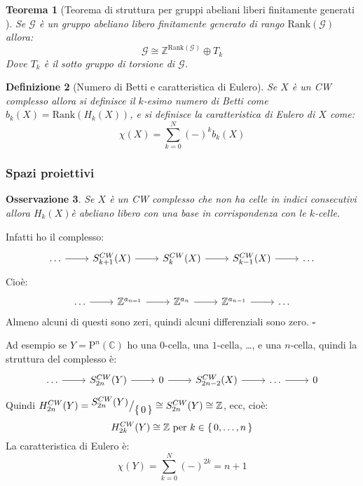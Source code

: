 \documentclass[10pt, twoside=false, x11names]{scrbook}
\newtheorem{theorem}{Teorema}[section]
\newtheorem{osservation}[theorem]{Osservazione}
\newtheorem{definition}[theorem]{Definizione}
\newenvironment{proof}{{\textbf{Dimostrazione}:}}{\hfill $\square$}
\newcommand{\Z}{\mathbb{Z}}
\newcommand{\rank}[1]{\mathrm{Rank}( #1 )}
\newcommand{\Pjc}[1]{\mathrm{P}^#1 (\mathbb{C})}
\newcommand*\quot[2]{{^{\textstyle #1}\big/_{\textstyle #2}}}
\begin{document}
\begin{theorem}[Teorema di struttura per gruppi abeliani liberi finitamente generati
  ]
  Se $ \mathcal{G} $ è un gruppo abeliano libero finitamente generato di rango
  $ \rank{\mathcal{G}} $ allora:
  \[
    \mathcal{G} \cong \Z^{\rank{\mathcal{G}}} \oplus T_k
  \]
  Dove $ T_k $ è il sotto gruppo di torsione di $ \mathcal{G} $.
\end{theorem}

\begin{definition}[Numero di Betti e caratteristica di Eulero]
  Se $ X $ è un CW complesso allora si definisce il $ k $-esimo
  numero di Betti come $ b_k(X) = \rank{H_k(X)} $, e si definisce
  la caratteristica di Eulero di $ X $ come:
  \[
    \chi(X) = \sum_{k=0}^{N} (-)^k b_k(X)
  \]
\end{definition}

\subsubsection{Spazi proiettivi}

\begin{osservation}
  Se $ X $ è un CW complesso che non ha celle in indici consecutivi
  allora $ H_k(X) $è abeliano libero con una base in corrispondenza
  con le $ k $-celle.
\end{osservation}
\begin{proof}
  Infatti ho il complesso:
  \[
    \begin{tikzcd}
      \dots \rar & S^{CW}_{k+1}(X) \rar & S_k^{CW}(X) \rar & S_{k-1}^{CW}(X) \rar & \dots
    \end{tikzcd}
  \]
  Cioè:
  \[
    \begin{tikzcd}
      \dots \rar & \Z^{a_{n=1}} \rar & \Z^{a_n} \rar & \Z^{a_{n-1}} \rar & \dots
    \end{tikzcd}
  \]
  Almeno alcuni di questi sono zeri, quindi alcuni differenziali sono zero.
\end{proof}

Ad esempio se $ Y = \Pjc{n} $ ho una $ 0 $-cella, una $ 1 $-cella, \dots,
e una $ n $-cella, quindi la struttura del complesso è:
\[
  \begin{tikzcd}
    \dots \rar & S^{CW}_{2n}(Y) \rar & 0 \rar & S_{2n - 2}^{CW}(X) \rar & \dots \rar & 0
  \end{tikzcd}
\]
Quindi $ H_{2n}^{CW}(Y) = \quot{S^{CW}_{2n}(Y)}{\set{0}} \cong S_{2n}^{CW}(Y) \cong \Z $,
ecc, cioè:
\[
  H_{2k}^{CW}(Y) \cong \Z \text{ per } k \in \set{0, \dots, n}
\]
La caratteristica di Eulero è:
\[
  \chi(Y) = \sum_{k=0}^N (-)^{2k} = n + 1
\]
\end{document}

